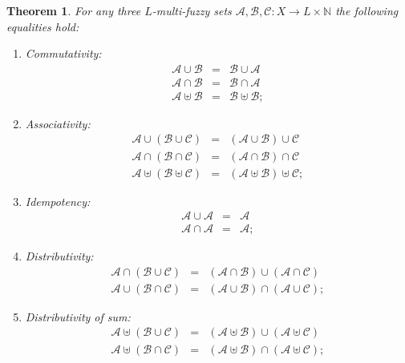 \documentclass{amsart}
\newtheorem{theorem}{Theorem}[section]
\theoremstyle{definition}
\begin{document}
\begin{theorem}
For any three $L$-multi-fuzzy sets $\mathscr{A},\mathscr{B},\mathscr{C}:X\rightarrow
L\times\mathbb{N}$ the following equalities hold:
\begin{enumerate}
\item Commutativity:
\begin{eqnarray*}
\mathscr{A}\cup\mathscr{B}&=&\mathscr{B}\cup\mathscr{A}\\
\mathscr{A}\cap\mathscr{B}&=&\mathscr{B}\cap\mathscr{A}\\
\mathscr{A}\uplus\mathscr{B}&=&\mathscr{B}\uplus\mathscr{B};
\end{eqnarray*}

\item Associativity:
\begin{eqnarray*}
\mathscr{A}\cup(\mathscr{B}\cup\mathscr{C})&=&
(\mathscr{A}\cup\mathscr{B})\cup\mathscr{C}\\
\mathscr{A}\cap(\mathscr{B}\cap\mathscr{C})&=&
(\mathscr{A}\cap\mathscr{B})\cap\mathscr{C}\\
\mathscr{A}\uplus(\mathscr{B}\uplus\mathscr{C})&=&
(\mathscr{A}\uplus\mathscr{B})\uplus\mathscr{C};
\end{eqnarray*}

\item Idempotency:
\begin{eqnarray*}
\mathscr{A}\cup\mathscr{A}&=&\mathscr{A}\\
\mathscr{A}\cap\mathscr{A}&=&\mathscr{A};
\end{eqnarray*}

\item Distributivity:
\begin{eqnarray*}
\mathscr{A}\cap(\mathscr{B}\cup\mathscr{C})&=&
(\mathscr{A}\cap\mathscr{B})\cup(\mathscr{A}\cap\mathcal{C})\\
\mathscr{A}\cup(\mathscr{B}\cap\mathscr{C})&=&
(\mathscr{A}\cup\mathscr{B})\cap(\mathscr{A}\cup\mathscr{C});
\end{eqnarray*}

\item Distributivity of sum:
\begin{eqnarray*}
\mathscr{A}\uplus(\mathscr{B}\cup\mathscr{C})&=&
(\mathscr{A}\uplus\mathscr{B})\cup(\mathscr{A}\uplus\mathscr{C})\\
\mathscr{A}\uplus(\mathscr{B}\cap\mathscr{C})&=&
(\mathscr{A}\uplus\mathscr{B})\cap(\mathscr{A}\uplus\mathscr{C});
\end{eqnarray*}
\end{enumerate}
\end{theorem}
\end{document}
